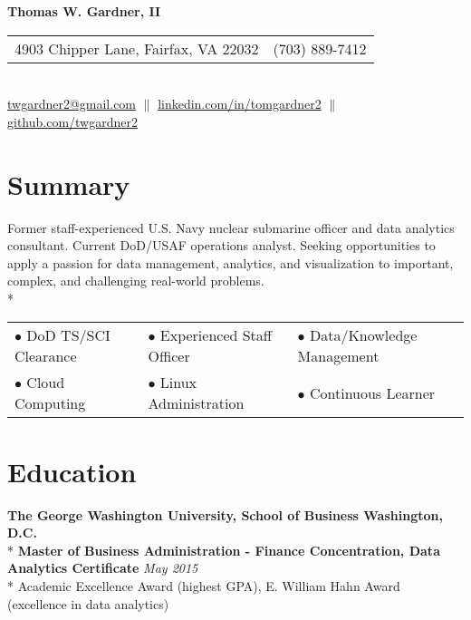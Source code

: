 \documentclass{article}
\begin{document}
\begin{center} 
\textbf{\LARGE Thomas W. Gardner, II} \\
\begin{tabular}{@{} l l}
	4903 Chipper Lane, Fairfax, VA 22032 	& (703) 889-7412 \\
\end{tabular} \\
\href{mailto:twgardner2@gmail.com}{twgardner2@gmail.com} $\parallel$ \href{https://www.linkedin.com/in/tomgardner2}{linkedin.com/in/tomgardner2} $\parallel$ \href{https://www.github.com/twgardner2}{github.com/twgardner2} \\
\end{center}
\section{Summary}
Former staff-experienced U.S. Navy nuclear submarine officer and data analytics consultant. Current DoD/USAF operations analyst. Seeking opportunities to apply a passion for data management, analytics, and visualization to important, complex, and challenging real-world problems. \\*
\begin{minipage}{\textwidth}

\vspace{0.25cm}
\centering
\begin{tabular}{@{}p{5cm} p{5cm} p{5cm}}
	$\bullet$ DoD TS/SCI Clearance	& $\bullet$ Experienced Staff Officer	& $\bullet$ Data/Knowledge Management \\*
	$\bullet$ Cloud Computing 		& $\bullet$ Linux Administration 		& $\bullet$ Continuous Learner \\*
\end{tabular}
\end{minipage}

\section{Education} 

\textbf{The George Washington University, School of Business \hfill Washington, D.C.} \\*
\textbf{Master of Business Administration - Finance Concentration, Data Analytics Certificate} \hfill \textit{May 2015} \\*
\textendash Academic Excellence Award (highest GPA), E. William Hahn Award (excellence in data analytics)\\
\end{document}
